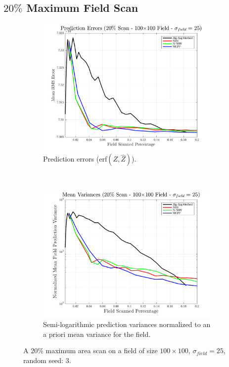 \FloatBarrier
\clearpage
\subsection{$20\%$ Maximum Field Scan}
\begin{figure}[htb!]
    \centering
    \begin{subfigure}[t]{0.65\textwidth}
        \centering
        \includegraphics[width=\linewidth]{figures/hbresults/pred_errs_20p_100x100_sf_25_seed_3.png}
        \captionsetup{skip=0.20\baselineskip,size=footnotesize}
        \caption{Prediction errors (erf$(Z,\hat{Z})$).}
        \label{fig:prederrs_sigma25_p20_s3}
    \end{subfigure}%
    \\
    \begin{subfigure}[t]{0.65\textwidth}
        \centering
        \includegraphics[width=\linewidth]{figures/hbresults/vars_20p_100x100_sf_25_seed_3.png}
        \captionsetup{skip=0.20\baselineskip,size=footnotesize}
        \caption{Semi-logarithmic prediction variances normalized to an a priori mean variance for the field.}
        \label{fig:prederrs_sigma25_p20_s3}
    \end{subfigure}
    \captionsetup{skip=0.20\baselineskip}
    \caption{A $20\%$ maximum area scan on a field of size $100 \times 100$, $\sigma_{field} = 25$, random seed: 3.}
    \label{fig:sigma25_p20_s3}
\end{figure}


